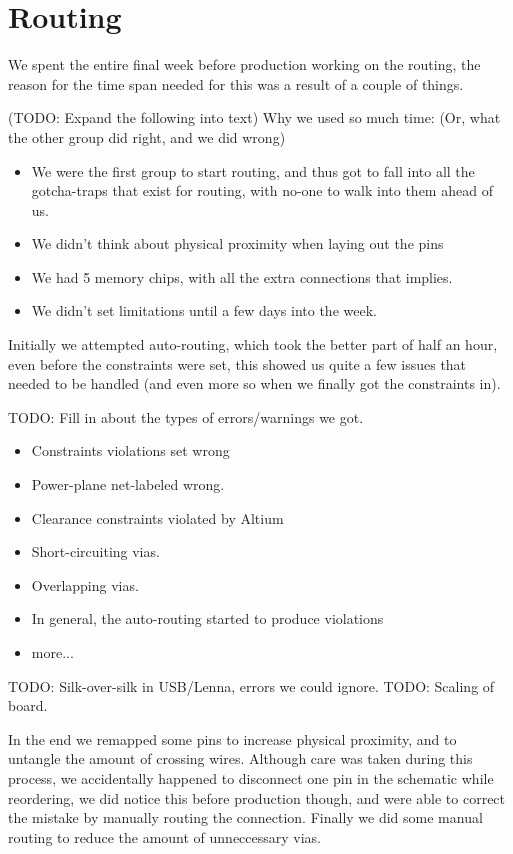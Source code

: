 \section {Routing}

We spent the entire final week before production working on the routing,
the reason for the time span needed for this was a result of a couple of
things.

(TODO: Expand the following into text)
Why we used so much time: (Or, what the other group did right, and we did wrong)
\begin {itemize}
\item We were the first group to start routing, and thus got to fall into all the gotcha-traps that
exist for routing, with no-one to walk into them ahead of us.
\item We didn't think about physical proximity when laying out the pins
\item We had 5 memory chips, with all the extra connections that implies.
\item We didn't set limitations until a few days into the week.
\end {itemize}

Initially we attempted auto-routing, which took the better part of half an hour,
even before the constraints were set, this showed us quite a few issues that needed
to be handled (and even more so when we finally got the constraints in).

TODO: Fill in about the types of errors/warnings we got.
\begin{itemize}
\item Constraints violations set wrong
\item Power-plane net-labeled wrong.
\item Clearance constraints violated by Altium
\item Short-circuiting vias.
\item Overlapping vias.
\item In general, the auto-routing started to produce violations 
\item more...
\end{itemize}
TODO: Silk-over-silk in USB/Lenna, errors we could ignore.
TODO: Scaling of board.

In the end we remapped some pins to increase physical proximity, and to untangle the
amount of crossing wires. Although care was taken during this process, we accidentally
happened to disconnect one pin in the schematic while reordering, we did notice this before
production though, and were able to correct the mistake by manually routing the connection.
Finally we did some manual routing to reduce the amount of unneccessary vias. \\

